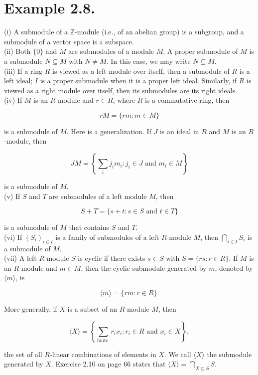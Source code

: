 \documentclass[10pt]{article}
\begin{document}
\section*{Example 2.8.}
(i) A submodule of a $\mathbb{Z}$-module (i.e., of an abelian group) is a subgroup, and a submodule of a vector space is a subspace.\\
(ii) Both $\{0\}$ and $M$ are submodules of a module $M$. A proper submodule of $M$ is a submodule $N \subseteq M$ with $N \neq M$. In this case, we may write $N \subsetneq M$.\\
(iii) If a ring $R$ is viewed as a left module over itself, then a submodule of $R$ is a left ideal; $I$ is a proper submodule when it is a proper left ideal. Similarly, if $R$ is viewed as a right module over itself, then its submodules are its right ideals.\\
(iv) If $M$ is an $R$-module and $r \in R$, where $R$ is a commutative ring, then

$$
r M=\{r m: m \in M\}
$$

is a submodule of $M$. Here is a generalization. If $J$ is an ideal in $R$ and $M$ is an $R$-module, then

$$
J M=\left\{\sum_{i} j_{i} m_{i}: j_{i} \in J \text { and } m_{i} \in M\right\}
$$

is a submodule of $M$.\\
(v) If $S$ and $T$ are submodules of a left module $M$, then

$$
S+T=\{s+t: s \in S \text { and } t \in T\}
$$

is a submodule of $M$ that contains $S$ and $T$.\\
(vi) If $\left(S_{i}\right)_{i \in I}$ is a family of submodules of a left $R$-module $M$, then $\bigcap_{i \in I} S_{i}$ is a submodule of $M$.\\
(vii) A left $R$-module $S$ is cyclic if there exists $s \in S$ with $S=\{r s: r \in R\}$. If $M$ is an $R$-module and $m \in M$, then the cyclic submodule generated by $m$, denoted by $\langle m\rangle$, is

$$
\langle m\rangle=\{r m: r \in R\} .
$$

More generally, if $X$ is a subset of an $R$-module $M$, then

$$
\langle X\rangle=\left\{\sum_{\text {finite }} r_{i} x_{i}: r_{i} \in R \text { and } x_{i} \in X\right\},
$$

the set of all $R$-linear combinations of elements in $X$. We call $\langle X\rangle$ the submodule generated by $X$. Exercise 2.10 on page 66 states that $\langle X\rangle=\bigcap_{X \subseteq S} S$.
\end{document}
